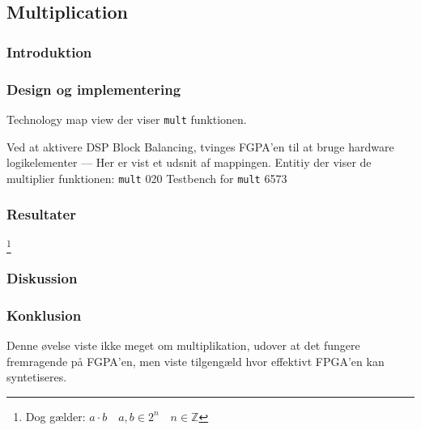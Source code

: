 \subsection{Multiplication}

\subsubsection{Introduktion}

\subsubsection{Design og implementering}




{Technology map view der viser \texttt{mult} funktionen.}


{Ved at aktivere DSP Block Balancing, tvinges FGPA'en til at bruge hardware logikelementer --- Her er vist et udsnit af mappingen.}
{Entitiy der viser de multiplier funktionen: \texttt{mult}}
{0}{20}
{Testbench for \texttt{mult}}
{65}{73}

\subsubsection{Resultater}


\footnote{Dog gælder: $a\cdot b \quad a,b \in 2^n \quad n \in \mathbb{Z}$}
\subsubsection{Diskussion}




\subsubsection{Konklusion}
Denne øvelse viste ikke meget om multiplikation, udover at det fungere fremragende på FGPA'en, men viste tilgengæld hvor effektivt FPGA'en kan syntetiseres.